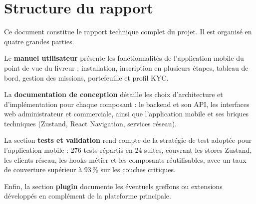 \section*{Structure du rapport}

Ce document constitue le rapport technique complet du projet. Il est organisé en quatre grandes parties.

Le \textbf{manuel utilisateur} présente les fonctionnalités de l'application mobile du point de vue du livreur : installation, inscription en plusieurs étapes, tableau de bord, gestion des missions, portefeuille et profil KYC.

La \textbf{documentation de conception} détaille les choix d'architecture et d'implémentation pour chaque composant : le backend et son API, les interfaces web administrateur et commerciale, ainsi que l'application mobile et ses briques techniques (Zustand, React Navigation, services réseau).

La section \textbf{tests et validation} rend compte de la stratégie de test adoptée pour l'application mobile : 276 tests répartis en 24 suites, couvrant les stores Zustand, les clients réseau, les hooks métier et les composants réutilisables, avec un taux de couverture supérieur à 93\,\% sur les couches critiques.

Enfin, la section \textbf{plugin} documente les éventuels greffons ou extensions développés en complément de la plateforme principale.